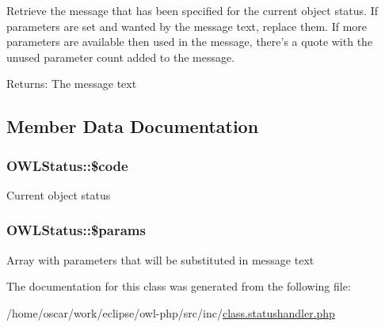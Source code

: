 Retrieve the message that has been specified for the current object status. If parameters are set and wanted by the message text, replace them. If more parameters are available then used in the message, there's a quote with the unused parameter count added to the message.

\begin{Desc}
\item[Returns:]The message text \end{Desc}


\subsection{Member Data Documentation}
\hypertarget{classOWLStatus_3c7c81c1d348dce97be39f5c90472b45}{
\subsubsection{\setlength{\rightskip}{0pt plus 5cm}OWLStatus::\$code}}
\label{classOWLStatus_3c7c81c1d348dce97be39f5c90472b45}


Current object status \hypertarget{classOWLStatus_7d2291be414fbec260732b1c233db5dc}{
\subsubsection{\setlength{\rightskip}{0pt plus 5cm}OWLStatus::\$params}}
\label{classOWLStatus_7d2291be414fbec260732b1c233db5dc}


Array with parameters that will be substituted in message text 

The documentation for this class was generated from the following file:\begin{CompactItemize}
\item 
/home/oscar/work/eclipse/owl-php/src/inc/\hyperlink{class_8statushandler_8php}{class.statushandler.php}\end{CompactItemize}
